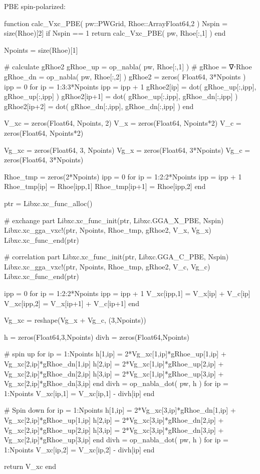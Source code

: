 PBE spin-polarized:
\begin{juliacode}
function calc_Vxc_PBE( pw::PWGrid, Rhoe::Array{Float64,2} )
  Nspin = size(Rhoe)[2]
  if Nspin == 1
    return calc_Vxc_PBE( pw, Rhoe[:,1] )
  end

  Npoints = size(Rhoe)[1]

  # calculate gRhoe2
  gRhoe_up = op_nabla( pw, Rhoe[:,1] ) # gRhoe = ∇⋅Rhoe
  gRhoe_dn = op_nabla( pw, Rhoe[:,2] )
  gRhoe2 = zeros( Float64, 3*Npoints )
  ipp = 0
  for ip = 1:3:3*Npoints
    ipp = ipp + 1
    gRhoe2[ip]   = dot( gRhoe_up[:,ipp], gRhoe_up[:,ipp] )
    gRhoe2[ip+1] = dot( gRhoe_up[:,ipp], gRhoe_dn[:,ipp] )
    gRhoe2[ip+2] = dot( gRhoe_dn[:,ipp], gRhoe_dn[:,ipp] )
  end

  V_xc = zeros(Float64, Npoints, 2)
  V_x  = zeros(Float64, Npoints*2)
  V_c  = zeros(Float64, Npoints*2)

  Vg_xc = zeros(Float64, 3, Npoints)
  Vg_x  = zeros(Float64, 3*Npoints)
  Vg_c  = zeros(Float64, 3*Npoints)

  Rhoe_tmp = zeros(2*Npoints)
  ipp = 0
  for ip = 1:2:2*Npoints
    ipp = ipp + 1
    Rhoe_tmp[ip] = Rhoe[ipp,1]
    Rhoe_tmp[ip+1] = Rhoe[ipp,2]
  end

  ptr = Libxc.xc_func_alloc()

  # exchange part
  Libxc.xc_func_init(ptr, Libxc.GGA_X_PBE, Nspin)
  Libxc.xc_gga_vxc!(ptr, Npoints, Rhoe_tmp, gRhoe2, V_x, Vg_x)
  Libxc.xc_func_end(ptr)

  # correlation part
  Libxc.xc_func_init(ptr, Libxc.GGA_C_PBE, Nspin)
  Libxc.xc_gga_vxc!(ptr, Npoints, Rhoe_tmp, gRhoe2, V_c, Vg_c)
  Libxc.xc_func_end(ptr)

  ipp = 0
  for ip = 1:2:2*Npoints
    ipp = ipp + 1
    V_xc[ipp,1] = V_x[ip] + V_c[ip]
    V_xc[ipp,2] = V_x[ip+1] + V_c[ip+1]
  end

  Vg_xc = reshape(Vg_x + Vg_c, (3,Npoints))

  h = zeros(Float64,3,Npoints)
  divh = zeros(Float64,Npoints)

  # spin up
  for ip = 1:Npoints
    h[1,ip] = 2*Vg_xc[1,ip]*gRhoe_up[1,ip] + Vg_xc[2,ip]*gRhoe_dn[1,ip]
    h[2,ip] = 2*Vg_xc[1,ip]*gRhoe_up[2,ip] + Vg_xc[2,ip]*gRhoe_dn[2,ip]
    h[3,ip] = 2*Vg_xc[1,ip]*gRhoe_up[3,ip] + Vg_xc[2,ip]*gRhoe_dn[3,ip]
  end
  divh = op_nabla_dot( pw, h )
  for ip = 1:Npoints
    V_xc[ip,1] = V_xc[ip,1] - divh[ip]
  end

  # Spin down
  for ip = 1:Npoints
    h[1,ip] = 2*Vg_xc[3,ip]*gRhoe_dn[1,ip] + Vg_xc[2,ip]*gRhoe_up[1,ip]
    h[2,ip] = 2*Vg_xc[3,ip]*gRhoe_dn[2,ip] + Vg_xc[2,ip]*gRhoe_up[2,ip]
    h[3,ip] = 2*Vg_xc[3,ip]*gRhoe_dn[3,ip] + Vg_xc[2,ip]*gRhoe_up[3,ip]
  end
  divh = op_nabla_dot( pw, h )
  for ip = 1:Npoints
    V_xc[ip,2] = V_xc[ip,2] - divh[ip]
  end
  
  return V_xc
end
\end{juliacode}
